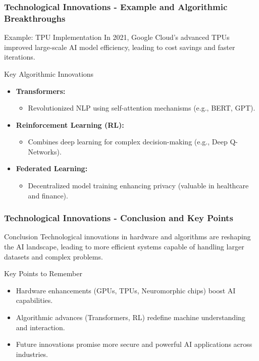\documentclass{beamer}
\begin{document}
\begin{frame}[fragile]
    \frametitle{Technological Innovations - Example and Algorithmic Breakthroughs}
    \begin{block}{Example: TPU Implementation}
        In 2021, Google Cloud's advanced TPUs improved large-scale AI model efficiency, leading to cost savings and faster iterations.
    \end{block}

    \begin{block}{Key Algorithmic Innovations}
        \begin{itemize}
            \item \textbf{Transformers:} 
            \begin{itemize}
                \item Revolutionized NLP using self-attention mechanisms (e.g., BERT, GPT).
            \end{itemize}
            
            \item \textbf{Reinforcement Learning (RL):} 
            \begin{itemize}
                \item Combines deep learning for complex decision-making (e.g., Deep Q-Networks).
            \end{itemize}
            
            \item \textbf{Federated Learning:} 
            \begin{itemize}
                \item Decentralized model training enhancing privacy (valuable in healthcare and finance).
            \end{itemize}
        \end{itemize}
    \end{block}
\end{frame}

\begin{frame}[fragile]
    \frametitle{Technological Innovations - Conclusion and Key Points}
    \begin{block}{Conclusion}
        Technological innovations in hardware and algorithms are reshaping the AI landscape, leading to more efficient systems capable of handling larger datasets and complex problems.
    \end{block}

    \begin{block}{Key Points to Remember}
        \begin{itemize}
            \item Hardware enhancements (GPUs, TPUs, Neuromorphic chips) boost AI capabilities.
            \item Algorithmic advances (Transformers, RL) redefine machine understanding and interaction.
            \item Future innovations promise more secure and powerful AI applications across industries.
        \end{itemize}
    \end{block}
\end{frame}
\end{document}
